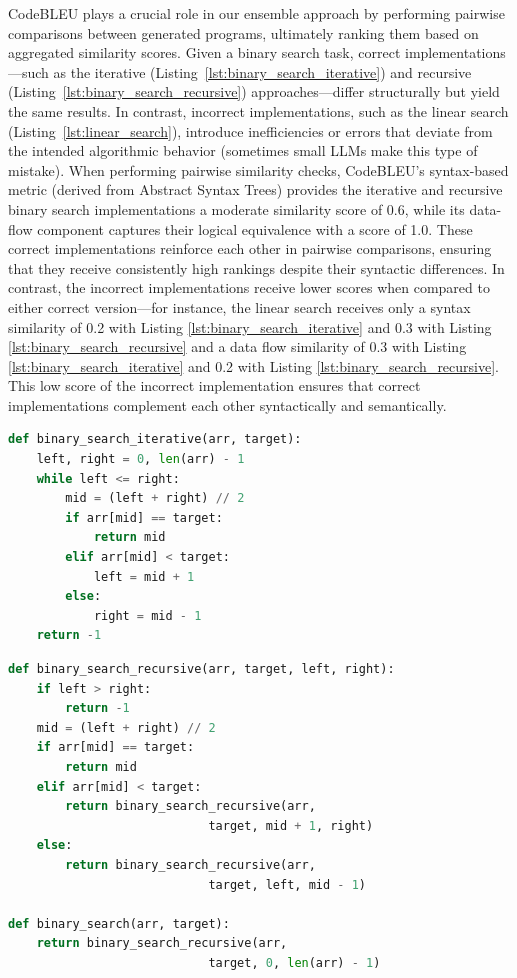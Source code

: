 \documentclass{article}
\begin{document}
CodeBLEU plays a crucial role in our ensemble approach by performing pairwise comparisons between generated programs, ultimately ranking them based on aggregated similarity scores. Given a binary search task, correct implementations—such as the iterative (Listing~\ref{lst:binary_search_iterative}) and recursive (Listing~\ref{lst:binary_search_recursive}) approaches—differ structurally but yield the same results. In contrast, incorrect implementations, such as the linear search (Listing~\ref{lst:linear_search}), introduce inefficiencies or errors that deviate from the intended algorithmic behavior (sometimes small LLMs make this type of mistake).
When performing pairwise similarity checks, CodeBLEU’s syntax-based metric (derived from Abstract Syntax Trees) provides the iterative and recursive binary search implementations a moderate similarity score of 0.6, while its data-flow component captures their logical equivalence with a score of 1.0. These correct implementations reinforce each other in pairwise comparisons, ensuring that they receive consistently high rankings despite their syntactic differences. In contrast, the incorrect implementations receive lower scores when compared to either correct version—for instance, the linear search receives only a syntax similarity of 0.2 with Listing \ref{lst:binary_search_iterative} and 0.3 with Listing \ref{lst:binary_search_recursive} and a data flow similarity of 0.3 with Listing \ref{lst:binary_search_iterative} and 0.2 with Listing \ref{lst:binary_search_recursive}. This low score of the incorrect implementation ensures that correct implementations complement each other syntactically and semantically.

\begin{lstlisting}[language=Python, caption={Iterative Binary Search Implementation}, label={lst:binary_search_iterative}]
def binary_search_iterative(arr, target):
    left, right = 0, len(arr) - 1
    while left <= right:
        mid = (left + right) // 2
        if arr[mid] == target:
            return mid
        elif arr[mid] < target:
            left = mid + 1
        else:
            right = mid - 1
    return -1
\end{lstlisting}

\begin{lstlisting}[language=Python, caption={Recursive Binary Search Implementation}, label={lst:binary_search_recursive}]
def binary_search_recursive(arr, target, left, right):
    if left > right:
        return -1
    mid = (left + right) // 2
    if arr[mid] == target:
        return mid
    elif arr[mid] < target:
        return binary_search_recursive(arr, 
                            target, mid + 1, right)
    else:
        return binary_search_recursive(arr, 
                            target, left, mid - 1)

def binary_search(arr, target):
    return binary_search_recursive(arr, 
                            target, 0, len(arr) - 1)
\end{lstlisting}
\end{document}
